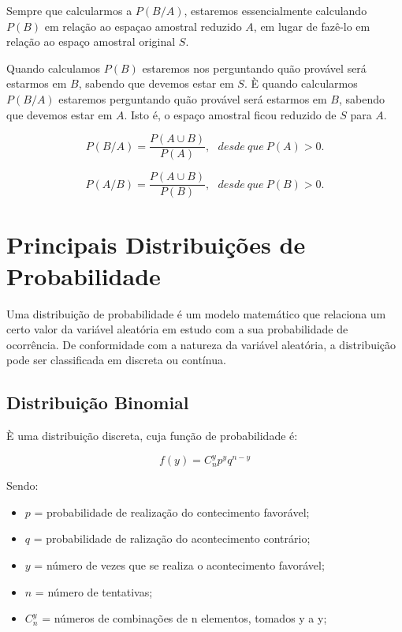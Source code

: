 \inic Sempre que calcularmos a $P(B/A)$, estaremos essencialmente calculando $P(B)$ em relação ao espaçao amostral reduzido $A$, em lugar de fazê-lo em relação ao espaço amostral original $S$.\vskip0.3cm

\inic Quando calculamos $P(B)$ estaremos nos perguntando quão provável será estarmos em $B$, sabendo que devemos estar em $S$. È quando calcularmos $P(B/A)$ estaremos perguntando quão provável será estarmos em $B$, sabendo que devemos estar em $A$. Isto é, o espaço amostral ficou reduzido de $S$ para $A$.

\begin{equation}
    P(B/A)= \frac{P(A \cup B)}{P(A)}, \ \ \ desde \ que \ P(A) > 0.
\end{equation}

\begin{equation}
    P(A/B)= \frac{P(A \cup B)}{P(B)}, \ \ \ desde \ que \ P(B) > 0.
\end{equation}


\newpage
\section{Principais Distribuições de Probabilidade}
 
 
\inic Uma distribuição de probabilidade é um modelo matemático que relaciona um certo valor da variável aleatória em estudo com a sua probabilidade de ocorrência. De conformidade com a natureza da variável aleatória, a distribuição pode ser classificada em discreta ou contínua.
 
\subsection{Distribuição Binomial}
\inic È uma distribuição discreta, cuja função de probabilidade é:
 
\begin{equation}
f(y) = C_{n}^{y}p^{y}q^{n-y}
\end{equation}
 
Sendo: \vskip0.3cm

\begin{itemize}
\item $p$ = probabilidade de realização do contecimento favorável; 
\item  $q$ = probabilidade de ralização do acontecimento contrário;  
\item $y$ = número de vezes que se realiza o acontecimento favorável;  
\item $n$ = número de tentativas; 
\item $C_{n}^{y}$ = números de combinações de n elementos, tomados y a y; 
\end{itemize} 

